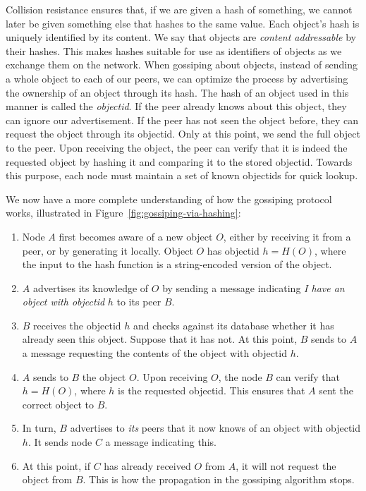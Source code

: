 Collision resistance ensures that, if we are given a hash of something, we cannot
later be given something else that hashes to the same value. Each object's hash
is uniquely identified by its content. We say that objects are
\emph{content addressable}
by their hashes.
This makes hashes suitable
for use as identifiers of objects as we exchange them on the network. When gossiping
about objects, instead of sending a whole object to each of our peers, we can optimize
the process by advertising the ownership of an object through its hash. The hash of
an object used in this manner is called the \emph{objectid}. If the peer already knows
about this object, they can ignore our advertisement. If the peer has not seen the
object before, they can request the object through its objectid. Only at this point, we
send the full object to the peer. Upon receiving the object, the peer can verify that
it is indeed the requested object by hashing it and comparing it to the stored objectid.
Towards this purpose, each node must maintain a set of known objectids for quick lookup.

We now have a more complete understanding of how the gossiping protocol works,
illustrated in Figure~\ref{fig:gossiping-via-hashing}:

\begin{enumerate}
  \item Node $A$ first becomes aware of a new object $O$, either by receiving it from a peer,
        or by generating it locally. Object $O$ has objectid $h = H(O)$, where the input to the
        hash function is a string-encoded version of the object.
  \item $A$ advertises its knowledge of $O$ by sending a message
        indicating \emph{I have an object with objectid} $h$ to its peer $B$.
  \item $B$ receives the objectid $h$ and checks against its database whether it has already seen
        this object. Suppose that it has not. At this point, $B$ sends to $A$ a message
        requesting the contents of the object with objectid $h$.
  \item $A$ sends to $B$ the object $O$. Upon receiving $O$, the node $B$ can verify that
        $h = H(O)$, where $h$ is the requested objectid. This ensures that $A$ sent the
        correct object to $B$.
  \item In turn, $B$ advertises to \emph{its} peers that it now knows of an object with
        objectid $h$. It sends node $C$ a message indicating this.
  \item At this point, if $C$ has already received $O$ from $A$, it will not request
        the object from $B$. This is how the propagation in the gossiping algorithm stops.
\end{enumerate}

